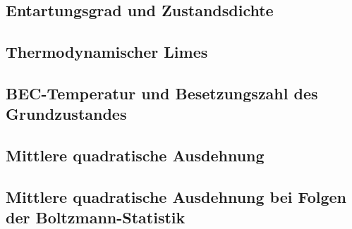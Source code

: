 \subsection{Entartungsgrad und Zustandsdichte}

\fehlt

\subsection{Thermodynamischer Limes}

\fehlt

\subsection{BEC-Temperatur und Besetzungszahl des Grundzustandes}

\fehlt

\subsection{Mittlere quadratische Ausdehnung}

\fehlt

\subsection{Mittlere quadratische Ausdehnung bei Folgen der Boltzmann-Statistik}

\fehlt

\IfFileExists{\bibliographyfile}{
    \printbibliography
}{}



